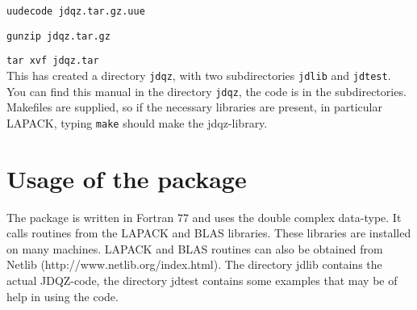 \documentclass[12pt,a4paper]{article}
\begin{document}
\indent
{\tt uudecode jdqz.tar.gz.uue}

\indent
{\tt gunzip jdqz.tar.gz}

\indent
{\tt tar xvf jdqz.tar}\\

This has created a directory {\tt jdqz}, with two subdirectories {\tt jdlib}
and {\tt jdtest}. You can find this manual in the directory {\tt jdqz}, the
code is in the subdirectories. Makefiles are supplied, so if the necessary
libraries are present, in particular LAPACK, typing {\tt make} should 
make the jdqz-library.

\section{Usage of the package}
The package is written in Fortran 77 and uses the double complex data-type.
It calls routines from the LAPACK and BLAS libraries. 
These libraries are installed
on many machines. LAPACK and BLAS routines can also be obtained from Netlib
(http://www.netlib.org/index.html). 
The directory jdlib contains the actual JDQZ-code, the directory jdtest
contains some examples that may be of help in using the code.
\end{document}
